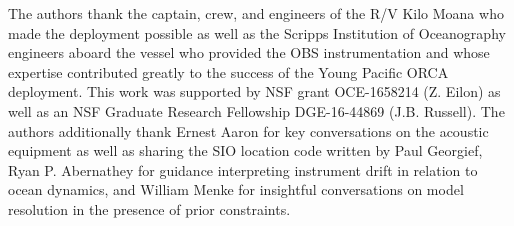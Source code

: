 The authors thank the captain, crew, and engineers of the R/V Kilo Moana who made the deployment possible as well as the Scripps Institution of Oceanography engineers aboard the vessel who provided the OBS instrumentation and whose expertise contributed greatly to the success of the Young Pacific ORCA deployment. This work was supported by NSF grant OCE-1658214 (Z. Eilon) as well as an NSF Graduate Research Fellowship DGE-16-44869 (J.B. Russell). The authors additionally thank Ernest Aaron for key conversations on the acoustic equipment as well as sharing the SIO location code written by Paul Georgief, Ryan P. Abernathey for guidance interpreting instrument drift in relation to ocean dynamics, and William Menke for insightful conversations on model resolution in the presence of prior constraints.